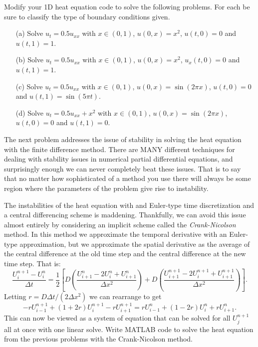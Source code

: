 \begin{problem}
    Modify your 1D heat equation code to solve the following problems.  For each be sure
    to classify the type of boundary conditions given.
    \begin{enumerate}
        \item[(a)] Solve $u_t = 0.5 u_{xx}$ with $x \in (0,1)$, $u(0,x) = x^2$, $u(t,0) =
            0$ and $u(t,1) = 1$.
        \item[(b)] Solve $u_t = 0.5 u_{xx}$ with $x \in (0,1)$, $u(0,x) = x^2$, $u_x(t,0) =
            0$ and $u(t,1) = 1$.
        \item[(c)] Solve $u_t = 0.5 u_{xx}$ with $x \in (0,1)$, $u(0,x) = \sin(2\pi x)$, $u(t,0) =
            0$ and $u(t,1) = \sin(5\pi t)$.
        \item[(d)] Solve $u_t = 0.5 u_{xx}+x^2$ with $x \in (0,1)$, $u(0,x) = \sin(2\pi x)$, $u(t,0) =
            0$ and $u(t,1) = 0$.
    \end{enumerate}
\end{problem}

The next problem addresses the issue of stability in solving the heat equation with the
finite difference method.  There are MANY different techniques for dealing with stability
issues in numerical partial differential equations, and surprisingly enough we can never
completely beat these issues.  That is to say that no matter how sophisticated of a method
you use there will always be some region where the parameters of the problem give rise to
instability.
\begin{problem}
    The instabilities of the heat equation with and Euler-type time discretization and a
    central differencing scheme is maddening.  Thankfully, we can avoid this issue almost
    entirely by considering an implicit scheme called the {\it Crank-Nicolson} method.  In
    this method we approximate the temporal derivative with an Euler-type approximation,
    but we approximate the spatial derivative as the average of the central difference at
    the old time step and the central difference at the new time step.  That is:
    \[ \frac{U_i^{n+1} - U_i^n}{\Delta t} = \frac{1}{2} \left[D \left( \frac{U_{i+1}^n - 2U_i^n +
        U_{i+1}^n}{\Delta x^2}\right) +D \left(\frac{U_{i+1}^{n+1} - 2U_i^{n+1} +
    U_{i+1}^{n+1}}{\Delta x^2} \right) \right]. \]
    Letting $r = D \Delta t / (2\Delta x^2)$ we can rearrange to get
    \[ -r U_{i-1}^{n+1} + (1+2r) U_{i}^{n+1} - r U_{i+1}^{n+1} = r U_{i-1}^{n} + (1-2r)
    U_{i}^{n} + r U_{i+1}^{n}. \]
    This can now be viewed as a system of equation that can be solved for all $U_j^{n+1}$
    all at once with one linear solve.  Write MATLAB code to solve the heat equation from
    the previous problems with the Crank-Nicolson method.
\end{problem}




